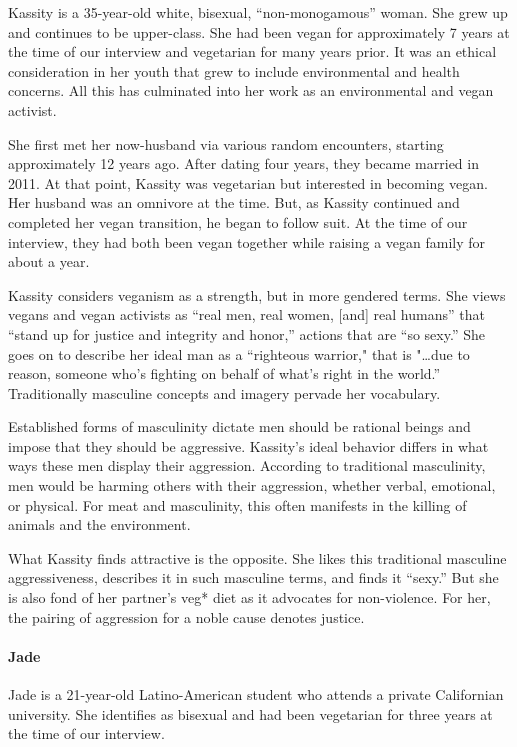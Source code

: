 \documentclass[twoside]{report}
\begin{document}
\begin{multicols}{2}
Kassity is a 35-year-old white, bisexual, ``non-monogamous'' woman. She
grew up and continues to be upper-class. She had been vegan for
approximately 7 years at the time of our interview and vegetarian for
many years prior. It was an ethical consideration in her youth that grew
to include environmental and health concerns. All this has culminated
into her work as an environmental and vegan activist.

She first met her now-husband via various random encounters, starting
approximately 12 years ago. After dating four years, they became married
in 2011. At that point, Kassity was vegetarian but interested in
becoming vegan. Her husband was an omnivore at the time. But, as Kassity
continued and completed her vegan transition, he began to follow suit.
At the time of our interview, they had both been vegan together while
raising a vegan family for about a year.

Kassity considers veganism as a strength, but in more gendered terms. She views vegans and vegan activists as ``real men, real women, {[}and{]} real humans'' that ``stand up for justice and integrity and honor,'' actions that are ``so sexy.'' She goes on to describe her ideal man as a ``righteous warrior," that is "\ldots due to reason, someone who's fighting on behalf of
what's right in the world.'' Traditionally masculine concepts and imagery pervade her vocabulary. 

Established forms of masculinity dictate men should be rational beings and impose that they should be aggressive. Kassity's ideal behavior differs in what ways these men display their aggression. According to traditional masculinity, men would be harming others with their aggression, whether verbal, emotional, or physical. For meat and masculinity, this often manifests in the killing of animals and the environment.

What Kassity finds attractive is the opposite. She likes this
traditional masculine aggressiveness, describes it in such masculine
terms, and finds it ``sexy.'' But she is also fond of her partner's veg* diet as it advocates for non-violence. For her, the pairing of aggression for a noble cause denotes justice.
%
\paragraph{Jade}

Jade is a 21-year-old Latino-American student who attends a private
Californian university. She identifies as bisexual and had been
vegetarian for three years at the time of our interview. 


\end{multicols}
\end{document}

